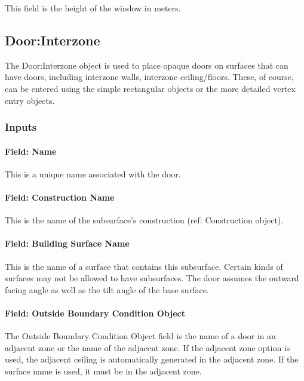 This field is the height of the window in meters.

\subsection{Door:Interzone}\label{doorinterzone}

The Door:Interzone object is used to place opaque doors on surfaces that can have doors, including interzone walls, interzone ceiling/floors. These, of course, can be entered using the simple rectangular objects or the more detailed vertex entry objects.

\subsubsection{Inputs}\label{inputs-18-010}

\paragraph{Field: Name}\label{field-name-14-010}

This is a unique name associated with the door.

\paragraph{Field: Construction Name}\label{field-construction-name-14}

This is the name of the subsurface's construction (ref: Construction object).

\paragraph{Field: Building Surface Name}\label{field-building-surface-name-4}

This is the name of a surface that contains this subsurface. Certain kinds of surfaces may not be allowed to have subsurfaces. The door assumes the outward facing angle as well as the tilt angle of the base surface.

\paragraph{Field: Outside Boundary Condition Object}\label{field-outside-boundary-condition-object-4}

The Outside Boundary Condition Object field is the name of a door in an adjacent zone or the name of the adjacent zone. If the adjacent zone option is used, the adjacent ceiling is automatically generated in the adjacent zone. If the surface name is used, it must be in the adjacent zone.

